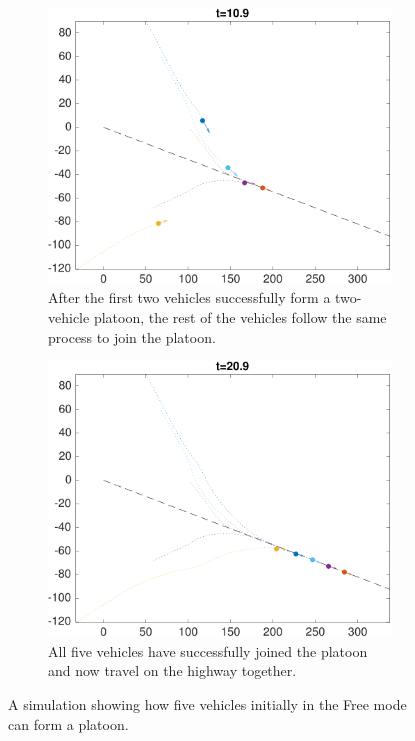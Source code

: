 \begin{figure}
    \begin{subfigure}[t]{0.45\textwidth} \label{subfig:fp_110}
        \includegraphics[width=\textwidth]{fig/fp_110}
        \caption{After the first two vehicles successfully form a two-vehicle platoon, the rest of the vehicles follow the same process to join the platoon.}
    \end{subfigure}
    \begin{subfigure}[t]{0.45\textwidth} \label{subfig:fp_210}
        \includegraphics[width=\textwidth]{fig/fp_210}
        \caption{All five vehicles have successfully joined the platoon and now travel on the highway together.}
    \end{subfigure}   
    \caption{A simulation showing how five vehicles initially in the Free mode can form a platoon. \label{fig:fp}}
\end{figure}


